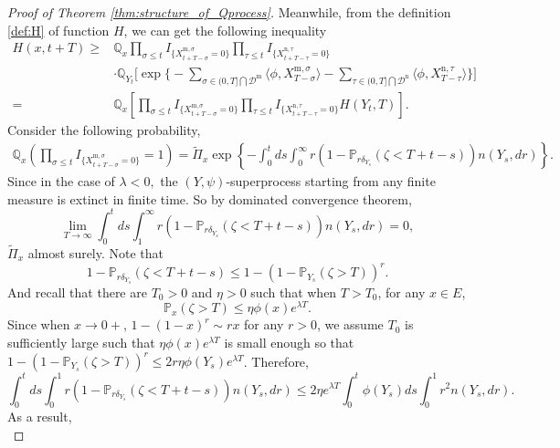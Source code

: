\documentclass[12pt,a4paper]{amsart}
\numberwithin{equation}{section}
\theoremstyle{plain}
\theoremstyle{definition}
\begin{document}
\begin{proof}[Proof of Theorem \ref{thm:structure_of_Qprocess}]
  Meanwhile, from the definition
  \eqref{def:H} of function $H$, we can get the following inequality
  \begin{equation}\label{eq:subsub}
    \begin{aligned}
      H(x,t+T)\geq& \mathbb Q_{x}\prod_{\sigma\leq t}I_{\{ X_{t+T-\sigma}^{{\mathrm m},\sigma}=0\}}\prod_{\tau\leq t}I_{\{ X_{t+T-\tau}^{{\mathrm n},\tau}=0\}}\\
      &\cdot\mathbb Q_{Y_t}\Big[\exp\Big\{-\sum_{\sigma\in (0, T]\bigcap \mathcal D^{\mathrm m}}\langle \phi, X_{T-\sigma}^{{\mathrm m},\sigma}\rangle -\sum_{\tau\in (0, T]\bigcap \mathcal D^{\mathrm n}}\langle \phi, X_{T-\tau}^{{\mathrm n},\tau}\rangle \Big\}\Big]\\
      =& \mathbb Q_{x}\left[\prod_{\sigma\leq t}I_{\{ X_{t+T-\sigma}^{{\mathrm m},\sigma}=0\}}\prod_{\tau\leq t}I_{\{ X_{t+T-\tau}^{{\mathrm n},\tau}=0\}}H(Y_t, T)\right].
    \end{aligned}
  \end{equation}
  Consider the following probability,
  \begin{eqnarray*}
    \mathbb Q_{x}\left(\prod_{\sigma\leq t}I_{\{ X_{t+T-\sigma}^{{\mathrm m},\sigma}=0\}}=1\right)
    =\widetilde\Pi_x\exp\left\{-\int_0^tds\int_0^\infty r(1-\mathbb P_{r\delta_{Y_s}}(\zeta<T+t-s))n(Y_s,dr)\right\}.
  \end{eqnarray*}
  Since in the case of $\lambda<0,$ the $(Y,\psi)$-superprocess starting from any finite measure is extinct in
  finite time.  So by dominated convergence theorem,
  \begin{equation}\label{eq:1_infty_limit}
    \lim_{T\rightarrow\infty}\int_0^tds\int_1^\infty r(1-\mathbb P_{r\delta_{Y_s}}(\zeta<T+t-s))n(Y_s,dr)=0,
  \end{equation}
  $\widetilde\Pi_x$ almost surely.   Note that
  \[
    1-\mathbb P_{r\delta_{Y_s}}(\zeta<T+t-s)\leq 1-(1-\mathbb P_{Y_s}(\zeta>T))^r.
  \]
  And recall that there are $T_0>0$ and $\eta>0$ such that when $T>T_0$, for any $x\in E$,
  \[
    \mathbb P_x(\zeta>T)\leq \eta \phi(x)e^{\lambda T}.
  \]
  Since when $x\rightarrow 0+$, $1-(1-x)^r\sim rx$ for any $r>0$, we assume $T_0$ is sufficiently large such that
  $\eta \phi(x)e^{\lambda T}$ is small enough so that $1-(1-\mathbb P_{Y_s}(\zeta>T))^r\leq 2r\eta \phi(Y_s)e^{\lambda T}$.
  Therefore,
  \[
    \int_0^tds\int_0^1 r(1-\mathbb P_{r\delta_{ Y_s}}(\zeta<T+t-s))n(Y_s,dr)\leq 2\eta e^{\lambda T}\int_0^t\phi(Y_s)ds\int_0^1 r^2 n(Y_s,dr).
  \]
  As a result,
  \begin{equation}\label{eq:01_limit}

\end{equation}
\end{proof}
\end{document}
